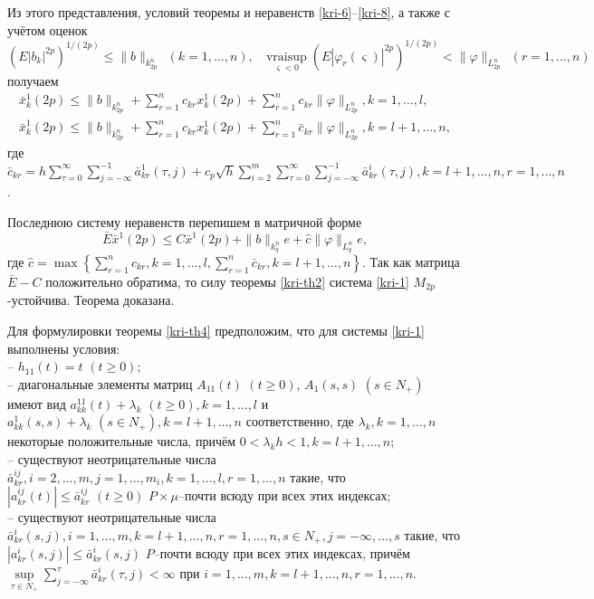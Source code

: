 Из этого представления, условий теоремы и неравенств \eqref{kri-6}--\eqref{kri-8},  а
также с учётом оценок
$$
(E|b_k|^{2p})^{1/(2p)} \leq \|b\|_{k^n_{2p}}
\ \ (k=1,\dots,n), \ \ \ \mathrel {\mathop {v r a i \sup} \limits
_{\varsigma < 0}}(E|\varphi _r(\varsigma )|^{2p})^{1/(2p)} <
\|\varphi  \|_{L_{2p}^n} \ \ (r=1,\dots,n)
$$ получаем
$$
\begin{array}{crl}
\bar x^1_k(2p) \leq \|b\|_{k^n_{2p}} + \sum \limits
_{r=1}^{n}c_{kr}x^1_k(2p) +
\sum \limits_{r=1}^{n}c_{kr} \|\varphi \|_{L_{2p}^n}, k = 1, \dots ,l,\\
\bar x^1_k(2p) \leq \|b\|_{k^n_{2p}} + \sum
\limits_{r=1}^{n}c_{kr}x^1_k(2p) + \sum \limits_{r=1}^{n}\bar
c_{kr}\|\varphi  \|_{L_{2p}^n}, k = l + 1, \dots ,n,
\end{array}
$$
где $\bar c_{kr} = h\sum \limits _{\tau=0 }^{\infty }\sum \limits
_{j=-\infty }^{-1}\bar a^{1}_{kr}(\tau,j) + c_p \sqrt{h}\sum \limits
_{i=2}^{m}\sum \limits _{\tau=0 }^{\infty }\sum \limits _{j=-\infty
}^{-1} \bar a^{i}_{kr}(\tau,j), k = l+1, \dots,n, r = 1, \dots, n$.

Последнюю систему неравенств перепишем в матричной форме
$$
\bar E\bar x^1 (2p) \leq C\bar x^1 (2p) + \|b\|_{k^n_{q}}e +
\hat c \|\varphi \|_{L^n_q} e,
$$
где $\hat c = \max \left\{ \sum \limits_{r=1}^{n}c_{kr}, k = 1, \dots
,l, \sum \limits_{r=1}^{n}\bar c_{kr}, k = l + 1, \dots ,n \right\}$.
Так как матрица  $\bar E - C$ положительно обратима, то силу теоремы
\ref{kri-th2} система \eqref{kri-1} $M_{2p}$-устойчива. Теорема доказана.

Для формулировки теоремы \ref{kri-th4} предположим, что для системы \eqref{kri-1}
выполнены условия:\\
\noindent
  -- $h_{11}(t) = t \,\,
(t \geq 0)$;\\
  -- диагональные элементы матриц $A_{11}(t)\,\, (t \geq
0)$, $A_1(s,s) \,\, (s \in N_+)$ имеют вид $a_{kk}^{11}(t) + \lambda
_k \,\, (t \geq 0), k=1, \dots, l$ и $a_{kk}^{1}(s,s) + \lambda _k
\,\, (s \in N_+), k=l + 1, \dots, n$ соответственно, где $\lambda _k,
k = 1, \dots, n$ некоторые положительные числа, причём $0 < \lambda
_kh < 1, k = l + 1, \dots, n$;\\
  -- существуют  неотрицательные числа  $\bar
a^{ij}_{kr}, i = 2,\dots,m, j = 1,\dots,m_i, k =1,\dots,l, r = 1,\dots,n$
 такие, что $|a^{ij}_{kr}(t)|\leq \bar
a^{ij}_{kr} \,\, (t\geq 0) $ $P\times\mu$--почти всюду при всех этих
индексах;\\
  -- существуют  неотрицательные числа
$\bar a^i_{kr}(s,j),i=1,\dots,m, k = l+1, \dots, n, r = 1,\dots,n, s\in
N_+, j=-\infty,\dots,s$ такие, что  $|a^i_{kr}(s,j)| \leq \bar
a^i_{kr}(s,j)$ $P$--почти всюду при всех этих индексах, причём $
\mathrel {\mathop {\sup} \limits _{\tau \in N_+ }} \sum \limits
_{j=-\infty }^{\tau}\bar a^{i}_{kr}(\tau,j) < \infty$ при
$i=1,\dots,m, k = l+1, \dots, n, r = 1,\dots,n$.

